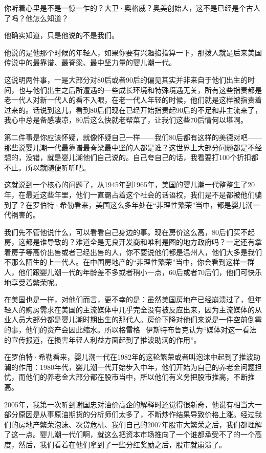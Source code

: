 你听着心里是不是一惊一乍的？大卫·奥格威？奥美创始人，这不是已经是个古人了吗？他怎么知道？

他确实知道，只是他说的不是我们。

他说的是他那个时候的年轻人，如果你要有兴趣掐指算一下，那拨人就是后来美国传说中的最靠谱、最脊梁、最中坚力量的婴儿潮一代。

这说明两件事，一是大部分对80后或者90后的偏见其实并非来自于他们出生的时间，也与他们出生之后所遭遇的一些成长环境和特殊境遇无关，所有这些指责都是老一代人对新一代人的看不入眼，在老一代人年轻的时候，他们就是这样被指责着过来的。话说到这儿，看到80后们现在已经开始指责起90后的不足和非主流来了，我心中总是备感凄凉，80后这么快就老帮菜了，让我们这些70后情何以堪啊。

第二件事是你应该怀疑，就像怀疑自己一样------我们80后都有这样的美德对吧------那些说婴儿潮一代最靠谱最脊梁最中坚的人都是谁？这世界上大部分问题都是不经想的，没错，就是婴儿潮他们自己说的。自己夸自己的话，我看要打100个折扣都不止。所以就随便听听吧。

这就说到一个核心的问题了，从1945年到1965年，美国的婴儿潮一代整整生了20年，在最近这些年里，他们一直霸占着这个社会的话语权，我们是不是都被他们骗到了？在罗伯特·希勒看来，美国这么多年处在``非理性繁荣''当中，都是婴儿潮一代祸害的。

我们先不管他说什么，可以看看自己身边的事。现在房价这么高，80后们买不起房，这都是谁导致的？难道全是无良开发商和唯利是图的地方政府吗？一定还有拿着房子等高价出售或者已经出售的人，你不要说他们都是温州人，他们大多是我们不那么陌生的上一代人。在中国房地产的``非理性繁荣''当中，你会看到这样一群人，他们跟婴儿潮一代的年龄差不多或者稍小一点，60后或者70后们，他们可快乐地享受着繁荣呢。

在美国也是一样，对他们而言，更不幸的是：虽然美国房地产已经崩溃过了，但年轻人的购房需求在美国的主流媒体中几乎完全没有被反应出来，因为主流媒体的从业人员大部分都是婴儿潮时期出生的那代人。房价下降对他们来说是一件空前倒霉的事，他们的资产会因此缩水。所以格雷格·伊斯特布鲁克认为``媒体对这一看法的宣传报道，在损害年轻人利益方面起到了推波助澜的作用''。

在罗伯特·希勒看来，婴儿潮一代在1982年的这轮繁荣或者叫泡沫中起到了推波助澜的作用：1980年代，婴儿潮一代开始步入中年，他们开始为自己的养老金问题担忧，而他们的养老金大部分都在股市当中，所以他们有义务把股市推高，不断推高。

2005年，我第一次听到谢国忠对油价高企的解释时还觉得很新奇，他说有相当大一部分原因是从事原油期货的分析师们太多了，不断炒作结果导致价格上涨。经过我们的房地产繁荣泡沫、次贷危机、我们自己的2007年股市大繁荣之后，我们都理解了这一点。婴儿潮一代们啊，就这么把资本市场推向了一个谁都承受不了的一个高度，然后，我们看着在他们拿到了一些分红奖励之后，股市就崩溃了。

